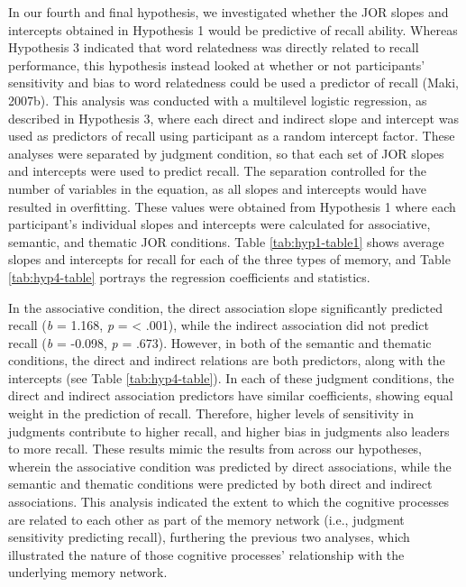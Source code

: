 \documentclass[english,,man]{apa6}
\begin{document}
In our fourth and final hypothesis, we investigated whether the JOR slopes and intercepts obtained in Hypothesis 1 would be predictive of recall ability. Whereas Hypothesis 3 indicated that word relatedness was directly related to recall performance, this hypothesis instead looked at whether or not participants' sensitivity and bias to word relatedness could be used a predictor of recall (Maki, 2007b). This analysis was conducted with a multilevel logistic regression, as described in Hypothesis 3, where each direct and indirect slope and intercept was used as predictors of recall using participant as a random intercept factor. These analyses were separated by judgment condition, so that each set of JOR slopes and intercepts were used to predict recall. The separation controlled for the number of variables in the equation, as all slopes and intercepts would have resulted in overfitting. These values were obtained from Hypothesis 1 where each participant's individual slopes and intercepts were calculated for associative, semantic, and thematic JOR conditions. Table \ref{tab:hyp1-table1} shows average slopes and intercepts for recall for each of the three types of memory, and Table \ref{tab:hyp4-table} portrays the regression coefficients and statistics.

In the associative condition, the direct association slope significantly predicted recall (\emph{b} = 1.168, \emph{p} = \textless{} .001), while the indirect association did not predict recall (\emph{b} = -0.098, \emph{p} = .673). However, in both of the semantic and thematic conditions, the direct and indirect relations are both predictors, along with the intercepts (see Table \ref{tab:hyp4-table}). In each of these judgment conditions, the direct and indirect association predictors have similar coefficients, showing equal weight in the prediction of recall. Therefore, higher levels of sensitivity in judgments contribute to higher recall, and higher bias in judgments also leaders to more recall. These results mimic the results from across our hypotheses, wherein the associative condition was predicted by direct associations, while the semantic and thematic conditions were predicted by both direct and indirect associations. This analysis indicated the extent to which the cognitive processes are related to each other as part of the memory network (i.e., judgment sensitivity predicting recall), furthering the previous two analyses, which illustrated the nature of those cognitive processes' relationship with the underlying memory network.
\end{document}
